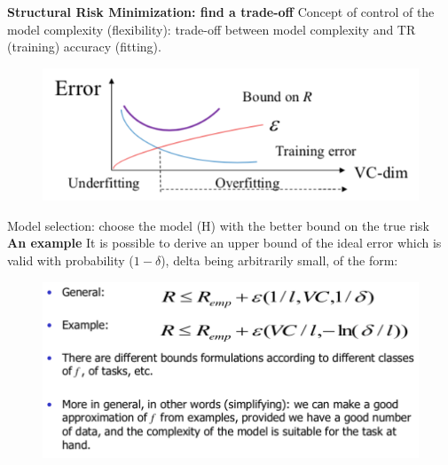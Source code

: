 \documentclass[../main.tex]{subfiles}
\begin{document}
\noindent\textbf{Structural Risk Minimization: find a trade-off}
Concept of control of the model complexity (flexibility): trade-off between model complexity and TR (training) accuracy (fitting).
\begin{figure}[H]
    \centering
    \includegraphics[scale = 0.4]{lectures/1_Introduction/intro_struct_risk.png}
\end{figure}

Model selection: choose the model (H) with the better bound on the true risk\\

\noindent\textbf{An example}
It is possible to derive an upper bound of the ideal error which is valid with probability ($1-\delta$), delta being arbitrarily small, of the form:
\begin{figure}[H]
    \centering
    \includegraphics[scale = 0.4]{lectures/1_Introduction/intro_vc_example.png}
\end{figure}
\end{document}
